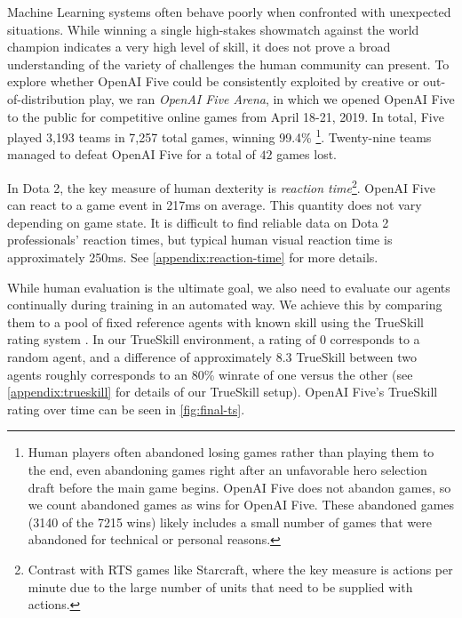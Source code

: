 \documentclass[11pt]{article}
\newcommand\nicetohave[1]{}
\newcommand{\trueskillname}{TrueSkill\xspace}
\newcommand{\dota}{Dota 2\xspace}
\newcommand{\openaifive}{OpenAI Five\xspace}
\newcommand{\openaiarena}{OpenAI Five Arena\xspace}
\begin{document}
Machine Learning systems often behave poorly when confronted with unexpected situations\cite{Dalvi:2004:AC:1014052.1014066}.
While winning a single high-stakes showmatch against the world champion indicates a very high level of skill, it does not prove a broad understanding of the variety of challenges the human community can present. 
To explore whether \openaifive could be consistently exploited by creative or out-of-distribution play, we ran {\it \openaiarena}, in which we opened \openaifive to the public for competitive online games from April 18-21, 2019. 
In total, Five played 3,193 teams in 7,257 total games, winning 99.4\%
\footnote{Human players often abandoned losing games rather than playing them to the end, even abandoning games right after an unfavorable hero selection draft before the main game begins. 
\openaifive does not abandon games, so we count abandoned games as wins for \openaifive. These abandoned games (3140 of the 7215 wins) likely includes a small number of games that were abandoned for technical or personal reasons.}.
Twenty-nine teams managed to defeat \openaifive for a total of $42$ games lost.

In \dota, the key measure of human dexterity is \emph{reaction time}\footnote{Contrast with RTS games like Starcraft, where the key measure is actions per minute due to the large number of units that need to be supplied with actions.}.
\openaifive can react to a game event in 217ms on average. 
This quantity does not vary depending on game state.
It is difficult to find reliable data on \dota professionals' reaction times, but typical human visual reaction time is approximately 250ms\cite{jain2015reaction}.
See \autoref{appendix:reaction-time} for more details.

While human evaluation is the ultimate goal, we also need to evaluate our agents continually during training in an automated way. 
We achieve this by comparing them to a pool of fixed reference agents with known skill using the \trueskillname rating system \cite{herbrich2007trueskill}.
In our \trueskillname environment, a rating of 0 corresponds to a random agent, and a difference of approximately 8.3 \trueskillname between two agents roughly corresponds to an 80\% winrate of one versus the other (see \autoref{appendix:trueskill} for details of our \trueskillname setup). \openaifive's \trueskillname rating over time can be seen in \autoref{fig:final-ts}.
\end{document}
